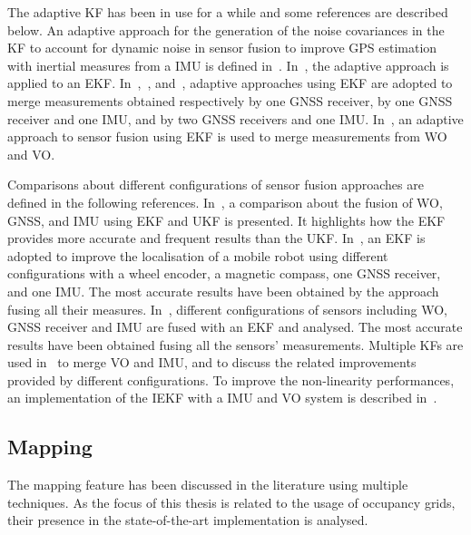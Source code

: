 The adaptive \gls{KF} has been in use for a while and some references are described below.
An adaptive approach for the generation of the noise covariances in the \gls{KF} to account for dynamic noise in sensor fusion to improve \gls{GPS} estimation with inertial measures from a \gls{IMU} is defined in~\cite{mohamed1999adaptive}.
In~\cite{grandoni_sensor_2001}, the adaptive approach is applied to an \gls{EKF}.
In~\cite{kong_using_2012},~\cite{Werries-2016-5519}, and~\cite{hao_modified_2018}, adaptive approaches using \gls{EKF} are adopted to merge measurements obtained respectively by one \gls{GNSS} receiver, by one \gls{GNSS} receiver and one \gls{IMU}, and by two \gls{GNSS} receivers and one \gls{IMU}.
In~\cite{chenavier_position_1992}, an adaptive approach to sensor fusion using \gls{EKF} is used to merge measurements from \gls{WO} and \gls{VO}.


Comparisons about different configurations of sensor fusion approaches are defined in the following references.
In~\cite{amador_robot_2019}, a comparison about the fusion of \gls{WO}, \gls{GNSS}, and \gls{IMU} using \gls{EKF} and \gls{UKF} is presented. It highlights how the \gls{EKF} provides more accurate and frequent results than the \gls{UKF}.
In~\cite{7373480}, an \gls{EKF} is adopted to improve the localisation of a mobile robot using different configurations with a wheel encoder, a magnetic compass, one \gls{GNSS} receiver, and one \gls{IMU}. The most accurate results have been obtained by the approach fusing all their measures.
In~\cite{8696103}, different configurations of sensors including \gls{WO}, \gls{GNSS} receiver and \gls{IMU} are fused with an \gls{EKF} and analysed. The most accurate results have been obtained fusing all the sensors' measurements.
Multiple \glspl{KF} are used in~\cite{liu2016stereo} to merge \gls{VO} and \gls{IMU}, and to discuss the related improvements provided by different configurations.
To improve the non-linearity performances, an implementation of the \gls{IEKF} with a \gls{IMU} and \gls{VO} system is described in~\cite{bloesch2017iterated}.


\subsection{Mapping}
\noindent The mapping feature has been discussed in the literature using multiple techniques.
As the focus of this thesis is related to the usage of occupancy grids, their presence in the state-of-the-art implementation is analysed.

